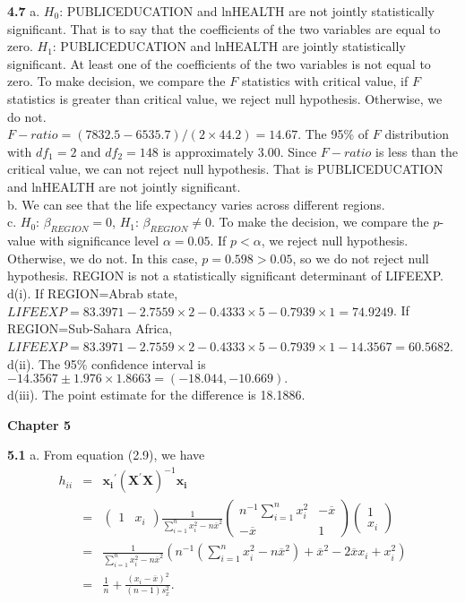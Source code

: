 \textbf{4.7} a. $H_0$: PUBLICEDUCATION and lnHEALTH are not jointly
statistically significant. That is to say that the coefficients of
the two variables are equal to zero. $H_1$: PUBLICEDUCATION and
lnHEALTH are jointly statistically significant. At least one of the
coefficients of the two variables is not equal to zero. To make
decision, we compare the $F$ statistics with critical value, if $F$
statistics is greater than critical value, we reject null
hypothesis. Otherwise,
we do not.\\
$F-ratio=(7832.5-6535.7)/(2\times 44.2) = 14.67$. The 95\% of $F$
distribution with $df_1=2$ and $df_2=148$ is approximately 3.00.
Since $F-ratio$ is less than the critical value, we can not reject
null hypothesis. That is PUBLICEDUCATION and lnHEALTH are not
jointly significant.\\
b. We can see that the life expectancy
varies across different regions.\\
c.  $H_0$: $\beta_{REGION}=0$, $H_1$: $\beta_{REGION}\neq0$. To make
the decision, we compare the $p$-value with significance level
$\alpha=0.05$. If $p<\alpha$, we reject null hypothesis. Otherwise,
we do not. In this case, $p=0.598>0.05$, so we do not reject null
hypothesis. REGION is not a statistically significant
determinant of LIFEEXP.\\
d(i). If REGION=Abrab state, $\widehat{LIFEEXP}=83.3971-2.7559\times
2-0.4333\times 5-0.7939\times 1=74.9249$. If REGION=Sub-Sahara
Africa, $\widehat{LIFEEXP}=83.3971-2.7559\times 2-0.4333\times
5-0.7939\times 1 -14.3567=60.5682$.\\
d(ii). The 95\% confidence interval is
$-14.3567\pm 1.976\times 1.8663=(-18.044,-10.669).$\\
d(iii). The point estimate for the difference is 18.1886.




\begin{center}\large \textbf{Chapter 5}\end{center}

\textbf{5.1} a. From equation (2.9), we have
\begin{eqnarray*}
h_{ii} & = & \mathbf{x_i}^{\prime}\left(\mathbf{X}^{\prime }\mathbf{X}\right)^{-1}\mathbf{x_i}\\
&=&\left(\begin{array}{cc}1 & x_i\end{array}\right)
\frac{1}{ \sum_{i=1}^{n}x_i^2-n\overline{x}^2}
\left(\begin{array}{cc}n^{-1}\sum_{i=1}^{n}x_i^2 & -\overline{x} \\-\overline{x} & 1\end{array}\right)
\left(\begin{array}{c}1 \\x_i\end{array}\right)\\
&=& \frac{1}{\sum_{i=1}^{n}x_i^2-n\overline{x}^2} \left(
n^{-1}(\sum_{i=1}^{n}x_i^2-n\overline{x}^2)+\overline{x}^2-2\overline{x}x_i+x_i^2
\right)\\
&=&\frac{1}{n}+\frac{(x_i-\overline{x})^2}{(n-1)s_x^2} .
\end{eqnarray*}


